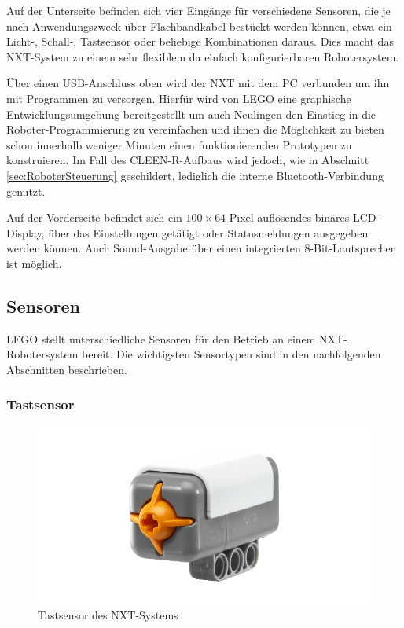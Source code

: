 Auf der Unterseite befinden sich vier Eingänge für verschiedene Sensoren, die je nach Anwendungszweck über Flachbandkabel bestückt werden können, etwa ein Licht-, Schall-, Tastsensor oder beliebige Kombinationen daraus. Dies macht das NXT-System zu einem sehr flexiblem da einfach konfigurierbaren Robotersystem.

Über einen USB-Anschluss oben wird der NXT mit dem PC verbunden um ihn mit Programmen zu versorgen. Hierfür wird von LEGO eine graphische Entwicklungsumgebung bereitgestellt um auch Neulingen den Einstieg in die Roboter-Programmierung zu vereinfachen und ihnen die Möglichkeit zu bieten schon innerhalb weniger Minuten einen funktionierenden Prototypen zu konstruieren. Im Fall des CLEEN-R-Aufbaus wird jedoch, wie in Abschnitt \ref{sec:RoboterSteuerung} geschildert, lediglich die interne Bluetooth-Verbindung genutzt.

Auf der Vorderseite befindet sich ein $100\times 64$ Pixel auflösendes binäres LCD-Display, über das Einstellungen getätigt oder Statusmeldungen ausgegeben werden können. Auch Sound-Ausgabe über einen integrierten 8-Bit-Lautsprecher ist möglich.

\subsection{Sensoren}

LEGO stellt unterschiedliche Sensoren für den Betrieb an einem NXT-Robotersystem bereit. Die wichtigsten Sensortypen sind in den nachfolgenden Abschnitten beschrieben.

\subsubsection{Tastsensor}

\begin{figure}[h]
\centering
\includegraphics[width=\textwidth/3]{Bilder/Robot/button_sensor}
\caption{Tastsensor des NXT-Systems}
\label{fig:buttonSensor}
\end{figure}

